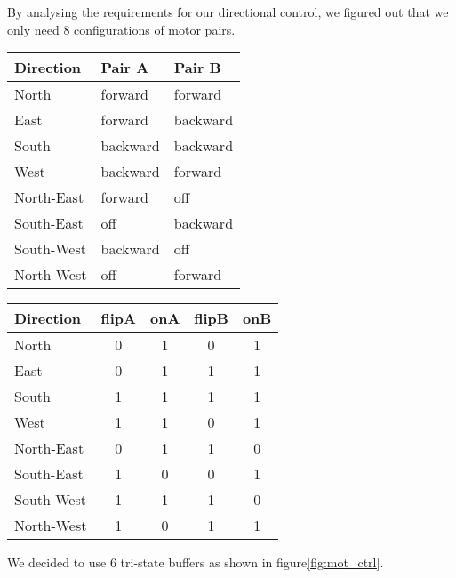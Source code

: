 By analysing the requirements for our directional control,
we figured out that we only need 8 configurations of motor pairs.
\begin{center}
\begin{tabular}{|l|l|l|}
	\hline
	Direction & Pair A & Pair B	\\
	\hline
	North & forward & forward \\
	East 	& forward & backward \\
	South & backward & backward \\
	West 	& backward & forward \\
	\hline
	North-East & forward & off \\
	South-East & off & backward \\
	South-West & backward & off\\
	North-West & off & forward \\
	\hline
\end{tabular}
\begin{tabular}{|l|c|c|c|c|}
	\hline
	Direction & flipA & onA & flipB & onB \\
	\hline
	North & 0 & 1 & 0 & 1 \\
	East 	& 0 & 1 & 1 & 1 \\
	South & 1 & 1 & 1 & 1 \\
	West 	& 1 & 1 & 0 & 1 \\
	\hline
	North-East & 0 & 1 & 1 & 0 \\
	South-East & 1 & 0 & 0 & 1 \\
	South-West & 1 & 1 & 1 & 0 \\
	North-West & 1 & 0 & 1 & 1 \\
	\hline
\end{tabular}
\end{center}

We decided to use 6 tri-state buffers as shown in figure\ref{fig:mot_ctrl}.
